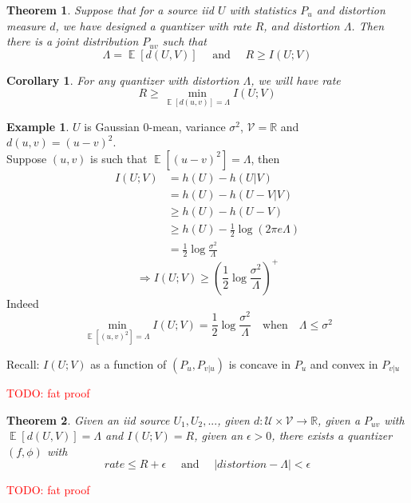 \documentclass[twoside]{article}
\newtheorem{theorem}{Theorem}[section]
\newtheorem{corollary}{Corollary}[theorem]
\theoremstyle{definition} %
\newtheorem{example}{Example}
\newcommand{\todo}[1]{\textcolor{red}{TODO: #1}}
\def\V{\mathcal{V}}
\def\U{\mathcal{U}}
\def\R{\mathbb{R}}
\DeclareMathOperator{\E}{\mathbb{E}}%
\begin{document}
\begin{theorem}
  Suppose that for a source iid $U$ with statistics $P_u$ and distortion measure $d$, we have designed a quantizer with rate $R$, and distortion $\Lambda$. Then there is a joint distribution $P_{uv}$ such that
  \[
    \Lambda = \E[d(U, V)] \quad \text{ and } \quad R \geq I(U;V)
  \]
\end{theorem}

\begin{corollary}
  For any quantizer with distortion $\Lambda$, we will have rate
  \[
    R \geq \min_{\E[d(u,v)] = \Lambda} I(U;V)
  \]
\end{corollary}

\begin{example}
  $U$ is Gaussian $0$-mean, variance $\sigma^2$, $\V = \R$ and $d(u,v) = (u-v)^2$.\\
  Suppose $(u,v)$ is such that $\E[(u-v)^2] = \Lambda$, then
  \begin{align*}
    I(U;V) &= h(U) - h(U|V) \\
           &= h(U) - h(U-V|V) \\
           &\geq h(U) - h(U-V) \\
           &\geq h(U) - \frac{1}{2} \log(2 \pi e \Lambda) \\
           &= \frac{1}{2} \log \frac{\sigma^2}{\Lambda}
  \end{align*}
  \[
    \Rightarrow I(U;V) \geq (\frac{1}{2} \log \frac{\sigma^2}{\Lambda})^+
  \]
  Indeed
  \[
     \min_{\E[(u,v)^2] = \Lambda} I(U;V) = \frac{1}{2} \log \frac{\sigma^2}{\Lambda} \quad \text{when} \quad \Lambda \leq \sigma^2
  \]

  Recall: $I(U;V)$ as a function of $(P_u, P_{v|u})$ is concave in $P_u$ and convex in $P_{v|u}$
\end{example}

\todo{fat proof}

\begin{theorem}
  Given an iid source $U_1, U_2, ...$, given $d: \U \times \V \rightarrow \R$, given a $P_{uv}$ with $\E[d(U,V)] = \Lambda$ and $I(U;V) = R$, given an $\epsilon > 0$, there exists a quantizer $(f, \phi)$ with
  \[
    rate \leq R + \epsilon \quad \text{ and } \quad |distortion - \Lambda| < \epsilon
  \]
\end{theorem}

\todo{fat proof}





\end{document}
